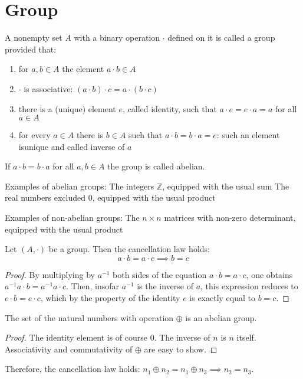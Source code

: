 \section{Group}
\begin{definition}
    A nonempty set $A$ with a binary operation $\cdot$ defined on it is called a group provided that:
    \begin{enumerate}
        \item for $a, b \in A$ the element $a \cdot b \in A$
        \item $\cdot$ is associative: $(a \cdot b) \cdot c = a \cdot (b \cdot c)$
        \item there is a (unique) element $e$, called identity, such that $a \cdot e = e \cdot a = a$ for all  $a \in A$
        \item for every $a \in A$ there is $b \in A$ such that $a \cdot b = b \cdot a = e$: such an element isunique and called inverse of $a$
    \end{enumerate}
    If $a \cdot b = b \cdot a$ for all $a, b \in A$ the group is called abelian.
\end{definition}

\begin{example}
    Examples of abelian groups:
The integers $\mathbb{Z}$, equipped with the usual sum
The real numbers excluded $0$, equipped with the usual product

Examples of non-abelian groups:
The $n \times n$ matrices with non-zero determinant, equipped with the usual product
\end{example}
\begin{proposition}
    Let $(A, \cdot)$ be a group. 
    Then the cancellation law holds:
\[a \cdot b = a \cdot c \implies b = c\]
\end{proposition}
\begin{proof}
    By multiplying by $a^{-1}$ both sides of the equation $a \cdot b = a \cdot c$, one obtains $a^{-1}a \cdot b = a^{-1} a \cdot c$. 
    Then, insofar $a^{-1}$ is the inverse of $a$, this expression reduces to $e \cdot b = e \cdot c$, which by the property of the identity $e$ is exactly equal to $b = c$.
\end{proof}

\begin{proposition}
    The set of the natural numbers with operation $\oplus$ is an abelian group.
\end{proposition}
\begin{proof}
    The identity element is of course $0$. 
    The inverse of $n$ is $n$ itself.
    Associativity and commutativity of $\oplus$ are easy to show.
\end{proof}
Therefore, the cancellation law holds: $n_1 \oplus n_2 = n_1 \oplus n_3 \implies n_2 = n_3$.